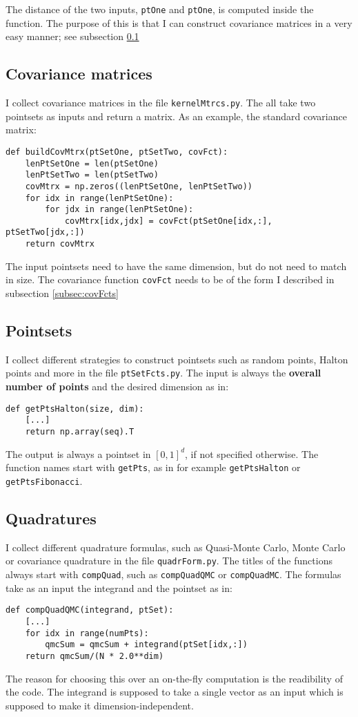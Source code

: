 \documentclass[11pt]{article}
\begin{document}
The distance of the two inputs, \texttt{ptOne} and \texttt{ptOne}, is computed inside the function. The purpose of this is that I can construct covariance matrices in a very easy manner; see subsection \ref{subsec:covMtrcs}

\subsection{Covariance matrices}
\label{subsec:covMtrcs}
I collect covariance matrices in the file \texttt{kernelMtrcs.py}. The all take two pointsets as inputs and return a matrix. As an example, the standard covariance matrix: 
\begin{Verbatim}[formatcom=\color{blue!50!black}]
def buildCovMtrx(ptSetOne, ptSetTwo, covFct):
    lenPtSetOne = len(ptSetOne)
    lenPtSetTwo = len(ptSetTwo)
    covMtrx = np.zeros((lenPtSetOne, lenPtSetTwo))
    for idx in range(lenPtSetOne):
        for jdx in range(lenPtSetOne):
            covMtrx[idx,jdx] = covFct(ptSetOne[idx,:], ptSetTwo[jdx,:])
    return covMtrx
\end{Verbatim}

The input pointsets need to have the same dimension, but do not need to match in size. The covariance function \texttt{covFct} needs to be of the form I described in subsection \ref{subsec:covFcts}


\subsection{Pointsets}
I collect different strategies to construct pointsets such as random points, Halton points and more in the file \texttt{ptSetFcts.py}. The input is always the \textbf{overall number of points} and the desired dimension as in:
\begin{Verbatim}[formatcom=\color{blue!50!black}]
def getPtsHalton(size, dim):
	[...]
	return np.array(seq).T
\end{Verbatim}
The output is always a pointset in $[0,1]^d$, if not specified otherwise. The function names start with \texttt{getPts}, as in for example \texttt{getPtsHalton} or \texttt{getPtsFibonacci}.


\subsection{Quadratures}
I collect different quadrature formulas, such as Quasi-Monte Carlo, Monte Carlo or covariance quadrature in the file \texttt{quadrForm.py}. The titles of the functions always start with \texttt{compQuad}, such as \texttt{compQuadQMC} or \texttt{compQuadMC}. The formulas take as an input the integrand and the pointset as in:
\begin{Verbatim}[formatcom=\color{blue!50!black}]
def compQuadQMC(integrand, ptSet):
	[...]
	for idx in range(numPts):
		qmcSum = qmcSum + integrand(ptSet[idx,:])
	return qmcSum/(N * 2.0**dim)
\end{Verbatim}
The reason for choosing this over an on-the-fly computation is the readibility of the code. The integrand is supposed to take a single vector as an input which is supposed to make it dimension-independent. \\
\end{document}
